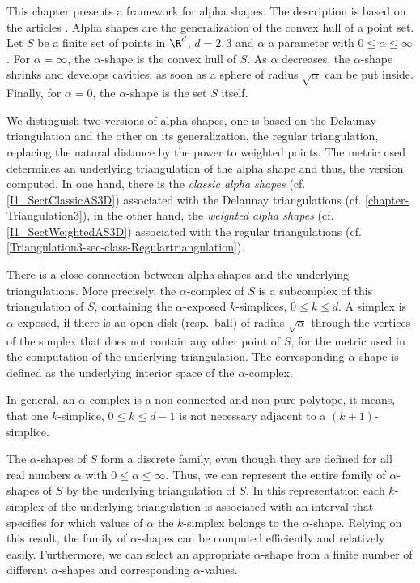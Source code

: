 This chapter presents a framework for alpha shapes. The description is based on
the articles \cite{em-tdas-94,e-was-92}. Alpha shapes are
the generalization of the convex hull of a point set. Let $S$ be a finite set of
points in $\R^d$, $d = 2,3$ and $\alpha$ a parameter with $0 \leq \alpha \leq
\infty$. For $\alpha = \infty$, the $\alpha$-shape is the convex hull of $S$. As 
$\alpha$ decreases, the $\alpha$-shape shrinks and develops cavities, as soon as 
a sphere of radius $\sqrt{\alpha}$ can be put inside.
Finally, for $\alpha = 0$, the $\alpha$-shape is the set $S$ itself.

We distinguish two versions of alpha shapes, one is based on the Delaunay
triangulation and the other on its generalization, the regular triangulation,
replacing the natural distance by the power to weighted points. The metric used
determines an underlying triangulation of the alpha shape and thus, the version
computed. 
In one hand, there is the {\em classic alpha shapes}
(cf. \ref{I1_SectClassicAS3D}) associated with the Delaunay triangulations
(cf. \ref{chapter-Triangulation3}), in the other hand, the {\em weighted alpha shapes}
(cf. \ref{I1_SectWeightedAS3D}) associated with the regular triangulations
(cf. \ref{Triangulation3-sec-class-Regulartriangulation}). 

There is a close connection between alpha shapes and the underlying
triangulations. More precisely, the $\alpha$-complex of $S$ is a
subcomplex of this triangulation of $S$, containing the $\alpha$-exposed
$k$-simplices, $0 \leq k \leq d$. A simplex is $\alpha$-exposed, if there is an
open disk (resp.\ ball) of radius $\sqrt{\alpha}$ through the vertices of the
simplex that does not contain any other point of $S$, for the metric used in
the computation of the underlying triangulation.  The corresponding
$\alpha$-shape is defined as the underlying interior space of the
$\alpha$-complex. 

In general, an $\alpha$-complex is a non-connected and non-pure polytope, it
means, that one $k$-simplice, $0 \leq k \leq d-1$ is not necessary adjacent to
a $(k+1)$-simplice.

The $\alpha$-shapes of $S$ form a discrete family, even though they
are defined for all real numbers $\alpha$ with $0 \leq \alpha
\leq \infty$. Thus, we can represent the entire family of $\alpha$-shapes
of $S$ by the underlying triangulation of $S$. In this representation
each $k$-simplex of the underlying triangulation is associated with an
interval that specifies for which values of $\alpha$ the $k$-simplex
belongs to the $\alpha$-shape. Relying on this result, the family of
$\alpha$-shapes can be computed efficiently and relatively
easily. Furthermore, we can select an appropriate $\alpha$-shape from a
finite number of different $\alpha$-shapes and corresponding
$\alpha$-values.


